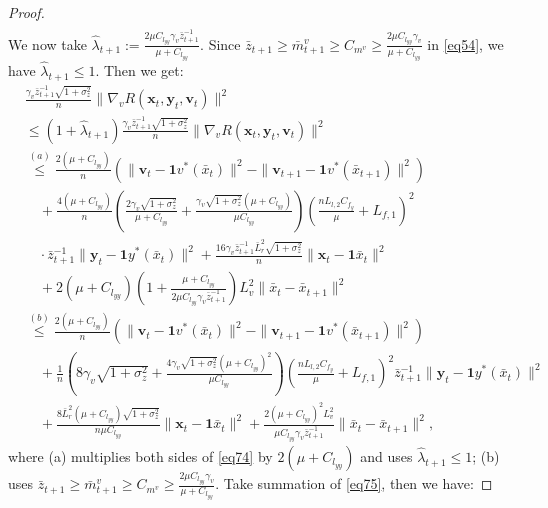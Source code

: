\documentclass{article}
\theoremstyle{plain}
\theoremstyle{definition}
\theoremstyle{remark}
\begin{document}
\begin{proof}
\begin{align}
\end{align}
We now take $\hat{\lambda}_{t+1} :=  \frac{2\mu C_{l_{yy}}\gamma_v\bar{z}_{t+1}^{-1}}{\mu + C_{l_{yy}}}$. Since 
$\bar{z}_{t+1} \geq \bar{m}^v_{t+1} \geq C_{m^v} \geq \frac{2\mu C_{l_{yy}}\gamma_v}{\mu + C_{l_{yy}}}$ in \cref{eq54}, 
we have $\hat{\lambda}_{t+1} \leq 1$. Then we get:                                           
\begin{align}
&\frac{\gamma_v\bar{z}_{t+1}^{-1}\sqrt{1+\sigma_z^2}}{n} \|\nabla_v R(\mathbf{x}_t, \mathbf{y}_t, \mathbf{v}_t)\|^2 \nonumber\\
&\leq (1 + \hat{\lambda}_{t+1}) 
\frac{\gamma_v\bar{z}_{t+1}^{-1}\sqrt{1+\sigma_z^2}}{n} \|\nabla_v R(\mathbf{x}_t, \mathbf{y}_t, \mathbf{v}_t)\|^2 \nonumber \\
&\overset{(a)}{\leq} \frac{2(\mu + C_{l_{yy}})}{n}
\left( \|\mathbf{v}_t - \mathbf{1}v^*(\bar{x}_t)\|^2 - \|\mathbf{v}_{t+1} - \mathbf{1}v^*(\bar{x}_{t+1})\|^2 \right) \nonumber \\
&\quad + \frac{4(\mu + C_{l_{yy}})}{n}\left(\frac{2\gamma_v\sqrt{1+\sigma_z^2}}{\mu + C_{l_{yy}}}+\frac{\gamma_v\sqrt{1+\sigma_z^2}(\mu + C_{l_{yy}})}{\mu C_{l_{yy}}} \right)\left(\frac{nL_{l,2}C_{f_y}}{\mu}+L_{f,1}\right)^2\nonumber\\
&\quad\cdot\bar{z}_{t+1}^{-1}\|\mathbf{y}_t - \mathbf{1}y^*(\bar{x}_t)\|^2+\frac{16\gamma_v\bar{z}_{t+1}^{-1}\bar{L}_r^2\sqrt{1+\sigma_z^2}}{n}\|\mathbf{x}_t-\mathbf{1}\bar{x}_t\|^2 \nonumber \\
&\quad + 2(\mu + C_{l_{yy}}) 
\left(1 +  \frac{\mu + C_{l_{yy}}}{2\mu C_{l_{yy}}\gamma_v\bar{z}_{t+1}^{-1}} \right) 
L_v^2 \|\bar{x}_t - \bar{x}_{t+1}\|^2 \nonumber \\
&\overset{(b)}{\leq}  \frac{2(\mu + C_{l_{yy}})}{n}
\left( \|\mathbf{v}_t - \mathbf{1}v^*(\bar{x}_t)\|^2 - \|\mathbf{v}_{t+1} - \mathbf{1}v^*(\bar{x}_{t+1})\|^2 \right) \nonumber \\
&\quad + \frac{1}{n}\left(8\gamma_v\sqrt{1+\sigma_z^2}+\frac{4\gamma_v\sqrt{1+\sigma_z^2}(\mu + C_{l_{yy}})^2}{\mu C_{l_{yy}}} \right)\left(\frac{nL_{l,2}C_{f_y}}{\mu}+L_{f,1}\right)^2\bar{z}_{t+1}^{-1}\|\mathbf{y}_t - \mathbf{1}y^*(\bar{x}_t)\|^2 \nonumber \\
&\quad +\frac{8\bar{L}_r^2(\mu + C_{l_{yy}})\sqrt{1+\sigma_z^2}}{n\mu C_{l_{yy}}}\|\mathbf{x}_t-\mathbf{1}\bar{x}_t\|^2+  \frac{2(\mu + C_{l_{yy}})^2L_v^2}{\mu C_{l_{yy}}\gamma_v\bar{z}_{t+1}^{-1}} \|\bar{x}_t - \bar{x}_{t+1}\|^2,\label{eq75}
\end{align}
where (a) multiplies both sides of \cref{eq74} by $2(\mu + C_{l_{yy}})$ and uses $\hat{\lambda}_{t+1} \leq 1$; (b) uses $\bar{z}_{t+1} \geq \bar{m}^v_{t+1} \geq C_{m^v} \geq \frac{2\mu C_{l_{yy}}\gamma_v}{\mu + C_{l_{yy}}}$. Take summation of \cref{eq75}, then we have:

\end{proof}
\end{document}
